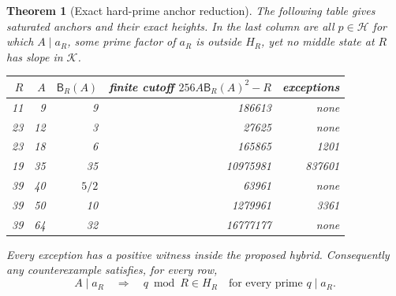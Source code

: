 \documentclass[11pt]{article}
\newtheorem{theorem}{Theorem}[section]
\theoremstyle{definition}\newtheorem{definition}[theorem]{Definition}
\theoremstyle{remark}\newtheorem{remark}[theorem]{Remark}
\newcommand{\K}{\mathcal K}
\newcommand{\HH}{\mathcal H}
\newcommand{\B}{\mathsf B}
\begin{document}
\begin{theorem}[Exact hard-prime anchor reduction]\label{thm:seven}
The following table gives saturated anchors and their exact heights. In the last column are all $p\in\HH$ for which $A\mid a_R$, some prime factor of $a_R$ is outside $H_R$, yet no middle state at $R$ has slope in $\K$.
\begin{center}
\begin{tabular}{rrrrr}
\toprule
$R$&$A$&$\B_R(A)$&finite cutoff $256A\B_R(A)^2-R$&exceptions\\
\midrule
11&9&9&186613&none\\
23&12&3&27625&none\\
23&18&6&165865&1201\\
19&35&35&10975981&837601\\
39&40&$5/2$&63961&none\\
39&50&10&1279961&3361\\
39&64&32&16777177&none\\
\bottomrule
\end{tabular}
\end{center}
Every exception has a positive witness inside the proposed hybrid. Consequently any counterexample satisfies, for every row,
\begin{equation}\label{eq:puresupport}
 A\mid a_R\quad\Longrightarrow\quad
  q\bmod R\in H_R\quad\text{for every prime }q\mid a_R.
\end{equation}
\end{theorem}
\end{document}
